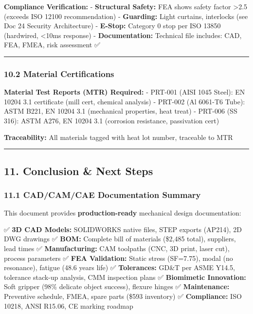 \documentclass[
]{article}
\begin{document}
\textbf{Compliance Verification:} - \textbf{Structural Safety:} FEA
shows safety factor \textgreater2.5 (exceeds ISO 12100 recommendation) -
\textbf{Guarding:} Light curtains, interlocks (see Doc 24 Security
Architecture) - \textbf{E-Stop:} Category 0 stop per ISO 13850
(hardwired, \textless10ms response) - \textbf{Documentation:} Technical
file includes: CAD, FEA, FMEA, risk assessment ✅

\begin{center}\rule{0.5\linewidth}{0.5pt}\end{center}

\hypertarget{material-certifications}{%
\subsubsection{10.2 Material
Certifications}\label{material-certifications}}

\textbf{Material Test Reports (MTR) Required:} - PRT-001 (AISI 1045
Steel): EN 10204 3.1 certificate (mill cert, chemical analysis) -
PRT-002 (Al 6061-T6 Tube): ASTM B221, EN 10204 3.1 (mechanical
properties, heat treat) - PRT-006 (SS 316): ASTM A276, EN 10204 3.1
(corrosion resistance, passivation cert)

\textbf{Traceability:} All materials tagged with heat lot number,
traceable to MTR

\begin{center}\rule{0.5\linewidth}{0.5pt}\end{center}

\hypertarget{conclusion-next-steps}{%
\subsection{11. Conclusion \& Next Steps}\label{conclusion-next-steps}}

\hypertarget{cadcamcae-documentation-summary}{%
\subsubsection{11.1 CAD/CAM/CAE Documentation
Summary}\label{cadcamcae-documentation-summary}}

This document provides \textbf{production-ready} mechanical design
documentation:

✅ \textbf{3D CAD Models:} SOLIDWORKS native files, STEP exports
(AP214), 2D DWG drawings ✅ \textbf{BOM:} Complete bill of materials
(\$2,485 total), suppliers, lead times ✅ \textbf{Manufacturing:} CAM
toolpaths (CNC, 3D print, laser cut), process parameters ✅ \textbf{FEA
Validation:} Static stress (SF=7.75), modal (no resonance), fatigue
(48.6 years life) ✅ \textbf{Tolerances:} GD\&T per ASME Y14.5,
tolerance stack-up analysis, CMM inspection plans ✅ \textbf{Biomimetic
Innovation:} Soft gripper (98\% delicate object success), flexure hinges
✅ \textbf{Maintenance:} Preventive schedule, FMEA, spare parts (\$593
inventory) ✅ \textbf{Compliance:} ISO 10218, ANSI R15.06, CE marking
roadmap
\end{document}

